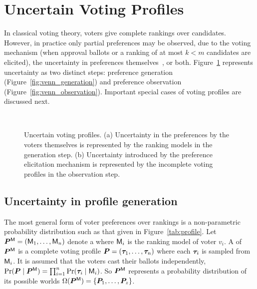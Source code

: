 \section{Uncertain Voting Profiles}
\label{sec:voting_profiles}

In classical voting theory, voters give complete rankings over candidates.
However, in practice only partial preferences may be observed, due to the voting mechanism (\eg when approval ballots or a ranking of at most $k<m$ candidates are elicited), the uncertainty in preferences themselves~\cite{marden1995analyzing}, or both.  Figure~\ref{fig:venn_diagrams_of_voting_profiles}  represents uncertainty as two distinct steps: preference generation (Figure~\ref{fig:venn_generation}) and preference observation (Figure~\ref{fig:venn_observation}). Important special cases of voting profiles are discussed next.

\begin{figure}[b!]
	\centering
	~
	\caption{Uncertain voting profiles. (a) Uncertainty in the preferences by the voters themselves is represented by the ranking models in the generation step. (b) Uncertainty introduced by the preference elicitation mechanism is represented by the incomplete voting profiles in the observation step.}
	\label{fig:venn_diagrams_of_voting_profiles}
\end{figure}

\subsection{Uncertainty in profile generation}
The most general form of voter preferences over rankings is a non-parametric probability distribution such as that given in Figure~\ref{tab:profile}. 
Let $\probaVP=(\enum[n]{\model})$ denote a  where $\model_i$ is the ranking model of voter $v_i$.
A  of $\probaVP$ is a complete voting profile $\completeVP = (\enum[n]{\ranking})$ where each $\ranking_i$ is sampled from $\model_i$.
It is assumed that the voters cast their ballots independently, \ie $\Pr(\completeVP \mid \probaVP) = \prod_{i=1}^{n} {\Pr(\ranking_i \mid \model_i)}$.
So $\probaVP$ represents a probability distribution of its possible worlds $\Omega(\probaVP) = \set{\enum[\numPW]{\completeVP}}$.

